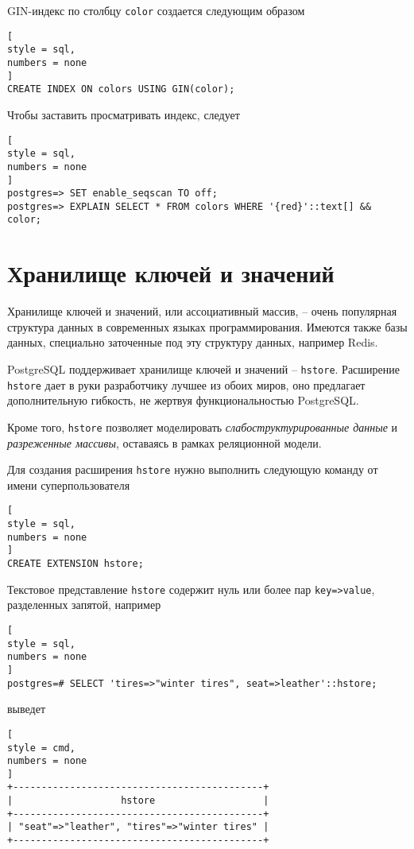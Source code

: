 \documentclass[%
	11pt,
	a4paper,
	utf8,
		]{article}
\begin{document}
GIN-индекс по столбцу \texttt{color} создается следующим образом
\begin{lstlisting}[
style = sql,
numbers = none
]
CREATE INDEX ON colors USING GIN(color);
\end{lstlisting}

Чтобы заставить просматривать индекс, следует
\begin{lstlisting}[
style = sql,
numbers = none
]
postgres=> SET enable_seqscan TO off;
postgres=> EXPLAIN SELECT * FROM colors WHERE '{red}'::text[] && color;
\end{lstlisting}

\section{Хранилище ключей и значений}

Хранилище ключей и значений, или ассоциативный массив, -- очень популярная структура данных в современных языках программирования. Имеются также базы данных, специально заточенные под эту структуру данных, например Redis.

PostgreSQL поддерживает хранилище ключей и значений -- \texttt{hstore}. Расширение \texttt{hstore} дает в руки разработчику лучшее из обоих миров, оно предлагает дополнительную гибкость, не жертвуя функциональностью PostgreSQL.

Кроме того, \texttt{hstore} позволяет моделировать \emph{слабоструктурированные данные} и \emph{разреженные массивы}, оставаясь в рамках реляционной модели.

Для создания расширения \texttt{hstore} нужно выполнить следующую команду от имени суперпользователя
\begin{lstlisting}[
style = sql,
numbers = none
]
CREATE EXTENSION hstore;
\end{lstlisting}

Текстовое представление \texttt{hstore} содержит нуль или более пар \texttt{key=>value}, разделенных запятой, например
\begin{lstlisting}[
style = sql,
numbers = none
]
postgres=# SELECT 'tires=>"winter tires", seat=>leather'::hstore;
\end{lstlisting}
выведет
\begin{lstlisting}[
style = cmd,
numbers = none
]
+--------------------------------------------+
|                   hstore                   |
+--------------------------------------------+
| "seat"=>"leather", "tires"=>"winter tires" |
+--------------------------------------------+
\end{lstlisting}
\end{document}

